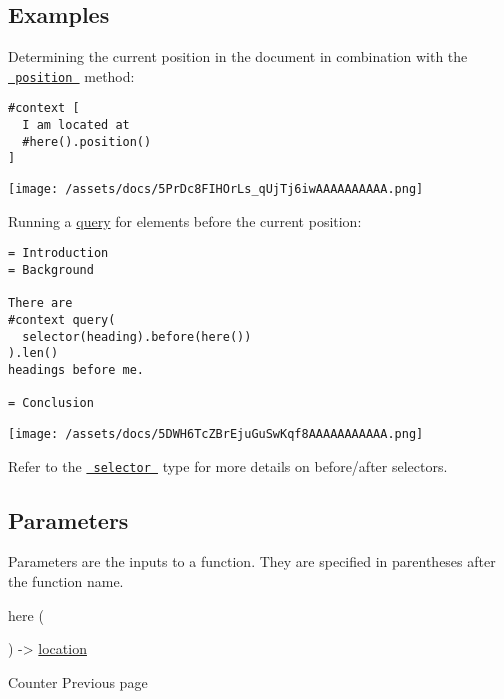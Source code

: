 \subsection{Examples}\label{examples}

Determining the current position in the document in combination with the
\href{/docs/reference/introspection/location/\#definitions-position}{\texttt{\ position\ }}
method:

\begin{verbatim}
#context [
  I am located at
  #here().position()
]
\end{verbatim}

\texttt{[image: /assets/docs/5PrDc8FIHOrLs\_qUjTj6iwAAAAAAAAAA.png]}

Running a \href{/docs/reference/introspection/query/}{query} for
elements before the current position:

\begin{verbatim}
= Introduction
= Background

There are
#context query(
  selector(heading).before(here())
).len()
headings before me.

= Conclusion
\end{verbatim}

\texttt{[image: /assets/docs/5DWH6TcZBrEjuGuSwKqf8AAAAAAAAAAA.png]}

Refer to the
\href{/docs/reference/foundations/selector/}{\texttt{\ selector\ }} type
for more details on before/after selectors.

\subsection{\texorpdfstring{{ Parameters
}}{ Parameters }}\label{parameters}

\label{parameters-tooltip}
Parameters are the inputs to a function. They are specified in
parentheses after the function name.

{ here } (

) -\textgreater{}
\href{/docs/reference/introspection/location/}{location}

\href{/docs/reference/introspection/counter/}{\pandocbounded{}}

{ Counter } { Previous page }

\href{/docs/reference/introspection/locate/}{\pandocbounded{}}

